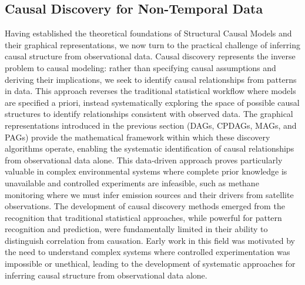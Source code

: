 \subsection{Causal Discovery for Non-Temporal Data}

Having established the theoretical foundations of Structural Causal Models and their graphical representations, we now turn to the practical challenge of inferring causal structure from observational data. Causal discovery represents the inverse problem to causal modeling: rather than specifying causal assumptions and deriving their implications, we seek to identify causal relationships from patterns in data. This approach reverses the traditional statistical workflow where models are specified a priori, instead systematically exploring the space of possible causal structures to identify relationships consistent with observed data. The graphical representations introduced in the previous section (DAGs, CPDAGs, MAGs, and PAGs) provide the mathematical framework within which these discovery algorithms operate, enabling the systematic identification of causal relationships from observational data alone. This data-driven approach proves particularly valuable in complex environmental systems where complete prior knowledge is unavailable and controlled experiments are infeasible, such as methane monitoring where we must infer emission sources and their drivers from satellite observations. The development of causal discovery methods emerged from the recognition that traditional statistical approaches, while powerful for pattern recognition and prediction, were fundamentally limited in their ability to distinguish correlation from causation. Early work in this field was motivated by the need to understand complex systems where controlled experimentation was impossible or unethical, leading to the development of systematic approaches for inferring causal structure from observational data alone.

